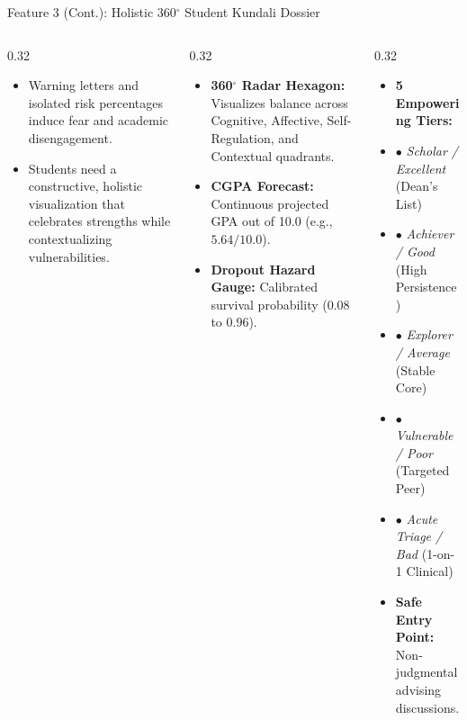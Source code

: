 \documentclass[aspectratio=169,10pt]{beamer}
\newcommand{\whybox}[2]{
  \begin{tcolorbox}[colframe=whyframe,colbacktitle=whyframe,colback=whybg,title=\textbf{WHY? The Problem \& Need (#1)}]
  \scriptsize #2
  \end{tcolorbox}
}
\newcommand{\howbox}[2]{
  \begin{tcolorbox}[colframe=howframe,colbacktitle=howframe,colback=howbg,title=\textbf{HOW? The Technology \& Algorithms (#1)}]
  \scriptsize #2
  \end{tcolorbox}
}
\newcommand{\outbox}[2]{
  \begin{tcolorbox}[colframe=outframe,colbacktitle=outframe,colback=outbg,title=\textbf{OUTCOMES? Measurable Impact \& Results (#1)}]
  \scriptsize #2
  \end{tcolorbox}
}
\begin{document}
\begin{frame}{Feature 3 (Cont.): Holistic 360$^\circ$ Student Kundali Dossier}
\begin{columns}[T]
\begin{column}{0.32\textwidth}
\whybox{The Humanizing Need}{
\begin{itemize}
    \item Warning letters and isolated risk percentages induce fear and academic disengagement.
    \item Students need a constructive, holistic visualization that celebrates strengths while contextualizing vulnerabilities.
\end{itemize}
}
\end{column}

\begin{column}{0.32\textwidth}
\howbox{Kundali Dossier Structure}{
\begin{itemize}
    \item \textbf{360$^\circ$ Radar Hexagon:} Visualizes balance across Cognitive, Affective, Self-Regulation, and Contextual quadrants.
    \item \textbf{CGPA Forecast:} Continuous projected GPA out of 10.0 (e.g., $5.64 / 10.0$).
    \item \textbf{Dropout Hazard Gauge:} Calibrated survival probability ($0.08$ to $0.96$).
\end{itemize}
}
\end{column}

\begin{column}{0.32\textwidth}
\outbox{Constructive Archetypes}{
\begin{itemize}
    \item \textbf{5 Empowering Tiers:}
    \item $\bullet$ \textit{Scholar / Excellent} (Dean's List)
    \item $\bullet$ \textit{Achiever / Good} (High Persistence)
    \item $\bullet$ \textit{Explorer / Average} (Stable Core)
    \item $\bullet$ \textit{Vulnerable / Poor} (Targeted Peer)
    \item $\bullet$ \textit{Acute Triage / Bad} (1-on-1 Clinical)
    \item \textbf{Safe Entry Point:} Non-judgmental advising discussions.
\end{itemize}
}
\end{column}
\end{columns}
\end{frame}
\end{document}
